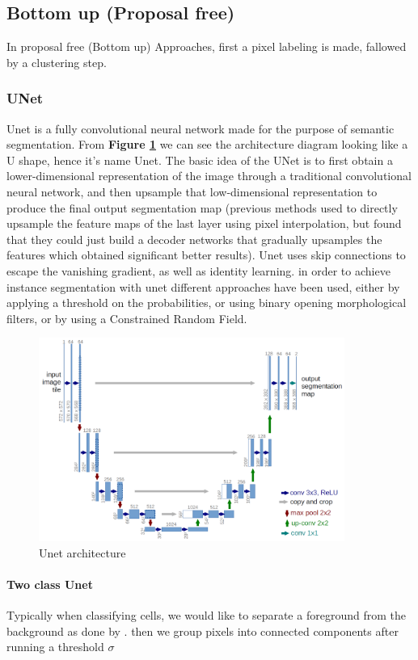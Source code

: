 \documentclass[main.tex]{subfiles}
\begin{document}
\subsection{Bottom up (Proposal free)}
In proposal free (Bottom up) Approaches, first a pixel labeling is made, fallowed by a clustering step.
\subsubsection{UNet}
Unet is a fully convolutional neural network made for the purpose of semantic segmentation. From \textbf{Figure \ref{fig:unet}} we can see the architecture diagram looking like a U shape, hence it's name Unet. The basic idea of the UNet is to first obtain a lower-dimensional representation of the image through a traditional convolutional neural network, and then upsample that low-dimensional representation to produce the final output segmentation map (previous methods used to directly upsample the feature maps of the last layer using pixel interpolation, but found that they could just build a decoder networks that gradually upsamples the features which obtained significant better results). Unet uses skip connections to escape the vanishing gradient, as well as identity learning. in order to achieve instance segmentation with unet different approaches have been used, either by applying a threshold on the probabilities, or using binary opening morphological filters, or by using a Constrained Random Field.

\begin{figure}
    \centering
    \includegraphics[width=10cm]{images/unet.png}
    \caption{Unet architecture}
    \label{fig:unet}
\end{figure}

\paragraph{Two class Unet} Typically when classifying cells, we would like to separate a foreground from the background as done by \cite{Ronneberger2015}. then we group pixels into connected components after running a threshold $\sigma$ 
\end{document}
